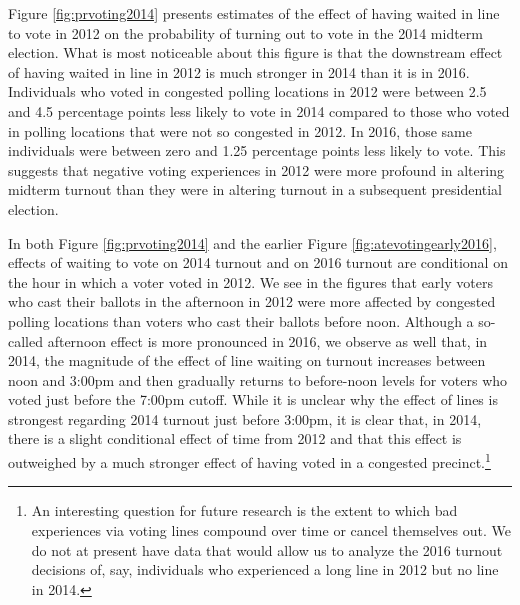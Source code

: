 \documentclass[12pt,titlepage]{article}
\begin{document}
Figure \ref{fig:prvoting2014} presents estimates of the effect of
having waited in line to vote in 2012 on the probability of turning
out to vote in the 2014 midterm election. What is most noticeable
about this figure is that the downstream effect of having waited in
line in 2012 is much stronger in 2014 than it is in 2016. Individuals
who voted in congested polling locations in 2012 were between 2.5 and
4.5 percentage points less likely to vote in 2014 compared to those
who voted in polling locations that were not so congested in 2012. In
2016, those same individuals were between zero and 1.25 percentage
points less likely to vote. This suggests that negative voting
experiences in 2012 were more profound in altering midterm turnout
than they were in altering turnout in a subsequent presidential
election.

In both Figure \ref{fig:prvoting2014} and the earlier Figure
\ref{fig:atevotingearly2016}, effects of waiting to vote on 2014
turnout and on 2016 turnout are conditional on the hour in which a
voter voted in 2012.  We see in the figures that early voters who cast
their ballots in the afternoon in 2012 were more affected by congested
polling locations than voters who cast their ballots before noon.
Although a so-called afternoon effect is more pronounced in 2016, we
observe as well that, in 2014, the magnitude of the effect of line
waiting on turnout increases between noon and 3:00pm and then
gradually returns to before-noon levels for voters who voted just
before the 7:00pm cutoff.  While it is unclear why the effect of lines
is strongest regarding 2014 turnout just before 3:00pm, it is clear
that, in 2014, there is a slight conditional effect of time from 2012
and that this effect is outweighed by a much stronger effect of having
voted in a congested precinct.\footnote{An interesting question for
  future research is the extent to which bad experiences via voting
  lines compound over time or cancel themselves out.  We do not at
  present have data that would allow us to analyze the 2016 turnout
  decisions of, say, individuals who experienced a long line in 2012
  but no line in 2014.}


\end{document}
